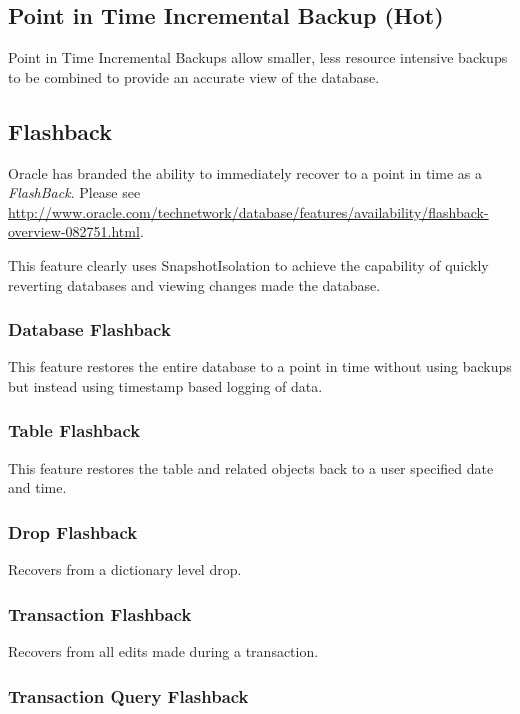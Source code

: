 \subsection{Point in Time Incremental Backup (Hot)}
Point in Time Incremental Backups allow smaller, less resource intensive backups
to be combined to provide an accurate view of the database.

\subsection{Flashback}

Oracle has branded the ability to immediately recover to a point in time as a
\emph{FlashBack}.  Please see
\url{http://www.oracle.com/technetwork/database/features/availability/flashback-overview-082751.html}.

This feature clearly uses SnapshotIsolation to achieve the capability of quickly
reverting databases and viewing changes made the database.

\subsubsection{Database Flashback}
This feature restores the entire database to a point in time without using
backups but instead using timestamp based logging of data.

\subsubsection{Table Flashback}

This feature restores the table and related objects back to a user specified
date and time.

\subsubsection{Drop Flashback}

Recovers from a dictionary level drop.

\subsubsection{Transaction Flashback}

Recovers from all edits made during a transaction.

\subsubsection{Transaction Query Flashback}

